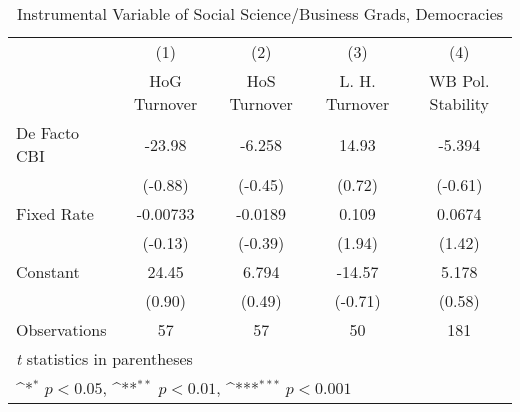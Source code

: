 \begin{table}[htbp]\centering
\def\sym#1{\ifmmode^{#1}\else\(^{#1}\)\fi}
\caption{Instrumental Variable of Social Science/Business Grads, Democracies \label{demIfivs4}}
\begin{tabular}{l*{4}{c}}
\toprule
                                        &\multicolumn{1}{c}{(1)}&\multicolumn{1}{c}{(2)}&\multicolumn{1}{c}{(3)}&\multicolumn{1}{c}{(4)}\\
                                        &\multicolumn{1}{c}{HoG Turnover}&\multicolumn{1}{c}{HoS Turnover}&\multicolumn{1}{c}{L. H. Turnover}&\multicolumn{1}{c}{WB Pol. Stability}\\
\midrule
De Facto CBI                            &   -23.98         &   -6.258         &    14.93         &   -5.394         \\
                                        &  (-0.88)         &  (-0.45)         &   (0.72)         &  (-0.61)         \\
\addlinespace
Fixed Rate                              & -0.00733         &  -0.0189         &    0.109         &   0.0674         \\
                                        &  (-0.13)         &  (-0.39)         &   (1.94)         &   (1.42)         \\
\addlinespace
Constant                                &    24.45         &    6.794         &   -14.57         &    5.178         \\
                                        &   (0.90)         &   (0.49)         &  (-0.71)         &   (0.58)         \\
\midrule
Observations                            &       57         &       57         &       50         &      181         \\
\bottomrule
\multicolumn{5}{l}{\footnotesize \textit{t} statistics in parentheses}\\
\multicolumn{5}{l}{\footnotesize \sym{*} \(p<0.05\), \sym{**} \(p<0.01\), \sym{***} \(p<0.001\)}\\
\end{tabular}
\end{table}
